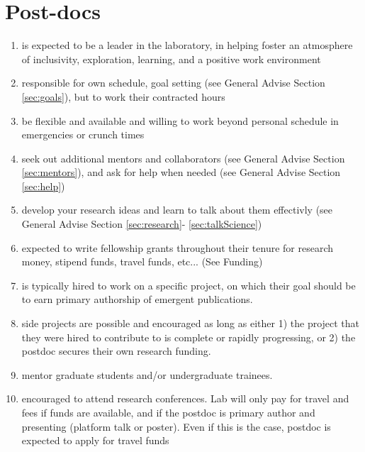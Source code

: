 \documentclass[12pt]{article}
\begin{document}
\section{Post-docs}
\begin{enumerate}
\item is expected to be a leader in the laboratory, in helping foster
  an atmosphere of inclusivity, exploration, learning, and a positive
  work environment
\item  responsible for own schedule, goal setting (see General
  Advise Section \ref{sec:goals}), but to work their contracted hours
\item be flexible and available and willing to work beyond personal
  schedule in emergencies or crunch times
\item seek out additional mentors and collaborators (see General
  Advise Section \ref{sec:mentors}), and ask for help when needed (see
  General Advise Section \ref{sec:help})
\item develop your research ideas and learn to talk about them
  effectivly (see General Advise Section \ref{sec:research}-
  \ref{sec:talkScience})
\item expected to write fellowship grants throughout their tenure
  for research money, stipend funds, travel funds, etc... (See Funding)
\item is typically hired to work on a specific project, on which
  their goal should be to earn primary authorship of emergent
  publications.
\item side projects are possible and encouraged as long as either 1)
  the project that they were hired to contribute to is complete or
  rapidly progressing, or 2) the postdoc secures their own research
  funding.
\item mentor graduate students and/or undergraduate trainees.
\item encouraged to attend research conferences. Lab will only pay
  for travel and fees if funds are available, and if the postdoc is
  primary author and presenting (platform talk or poster). Even if
  this is the case, postdoc is expected to apply for travel funds
\end{enumerate}
\end{document}
